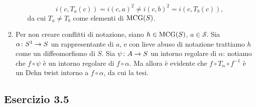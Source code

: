 \begin{enumerate}[(1)]
\begin{itemize}
\[
i(c,T_a(c))=i(c,a)^2\neq i(c,b)^2=i(c,T_b(c)),
\]
da cui $T_a\neq T_b$ come elementi di $\operatorname{MCG}(S)$.
\end{itemize}
\item Per non creare conflitti di notazione, siano $h\in\operatorname{MCG}(S)$, $a\in\mathcal{S}$. Sia $\map{\alpha}{S^1}{S}$ un rappresentante di $a$, e con lieve abuso di notazione trattiamo $h$ come un diffeomorfismo di $S$. Sia $\map{\psi}{A}{S}$ un intorno regolare di $\alpha$: notiamo che $f\circ\psi$ è un intorno regolare di $f\circ\alpha$. Ma allora è evidente che $f\circ T_\alpha\circ f^{-1}$ è un Dehn twist intorno a $f\circ\alpha$, da cui la tesi.
\end{enumerate}

\subsection*{Esercizio 3.5}
\newcommand{\ngon}[3][0]{
\tikzmath{
\g = #2;
\r = #3;
\n = \g * 4;
\twog = \g * 2;
}
\foreach \i [evaluate=\i as \an using 180*((2*\i-1)/\n+1)] in {1,...,\n} {
    \tkzDefPoint(\an:\r){x_\i}
    \tikzmath{\an1 = \an + #1;}
    \tkzLabelPoint[label=\an1:$x_{\i}$,anchor=base](x_\i){}
}
\begin{scope}[on background layer]
\tkzFillPolygon[blue!10](x_1,x_...,x_\n)
\end{scope}
\foreach \i in {1,...,\twog} {
    \tikzmath{
        \j = \i + 1;
        \l = \twog + \i;
        \k = \l + 1;
        if \k > \n then {
            \k = 1;
        };
        if Mod(\i, 2) == 0 then {
            let \col = white;
        } else {
            let \col = black;
        };
        \s = .15 * 3 / (\r * 5.1 * sin(180 / \n));
        \t = (\i + Mod(\i, 2) - 2) / 2;
    }
    \foreach \b/\e in {\i/\j,\k/\l} {
        \tkzDrawSegment[postaction={decorate},decoration={markings,mark=between positions (0.5+\s*0.75-\s/2*\t) and (0.51+\s*0.75+\s/2*\t) step \s with {\arrow[scale=1.2,\col]{Triangle}\arrow[scale=1.2,black]{Triangle[open]}}}](x_\b,x_\e)
    }
}
\tkzDrawPoints(x_1,x_...,x_\n)
}

